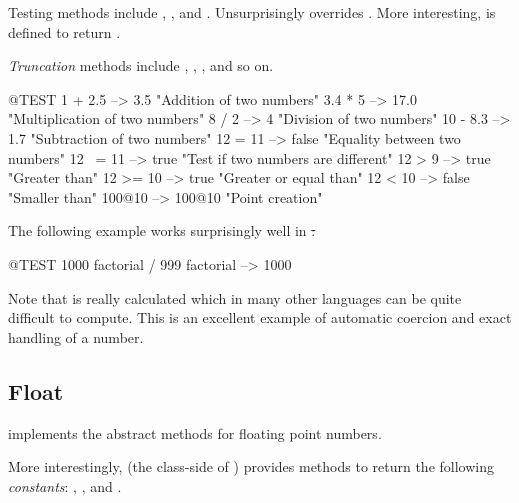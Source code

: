 \documentclass[a4paper,10pt,twoside]{book}
\begin{document}
Testing methods include , ,  and . Unsurprisingly  overrides . More interesting,  is defined to return .

\emph{Truncation} methods include , , ,  and so on.

\begin{code}{@TEST}
1 + 2.5     --> 3.5             "Addition of two numbers"
3.4 * 5      --> 17.0           "Multiplication of two numbers"
8 / 2         --> 4                 "Division of two numbers"
10 - 8.3   --> 1.7              "Subtraction of two numbers"
12 = 11    --> false           "Equality between two numbers"
12 ~= 11 --> true            "Test if two numbers are different"
12 > 9      --> true            "Greater than"
12 >= 10  --> true            "Greater or equal  than"
12 < 10    --> false           "Smaller than"
100@10   --> 100@10    "Point creation"
\end{code}

The following example works surprisingly well in \st:
\begin{code}{@TEST}
1000 factorial / 999 factorial --> 1000
\end{code}
Note that  is really calculated which in many other languages can be quite difficult to compute. This is an excellent example of automatic coercion and exact handling of a number.


\subsection{Float}

 implements the abstract  methods for floating point numbers.

More interestingly,  (\ie the class-side of ) provides methods to return the following \emph{constants}: , ,  and .
\end{document}
